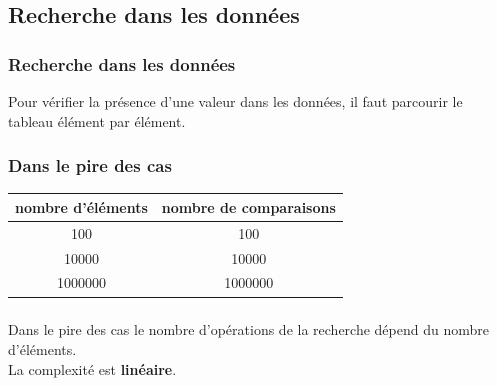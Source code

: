 \documentclass[svgnames,11pt]{beamer}
\begin{document}
\subsection{Recherche dans les données}
\begin{frame}
    \frametitle{Recherche dans les données}

    Pour vérifier la présence d'une valeur dans les données, il faut parcourir le tableau élément par élément.
\begin{center}
\end{center}

\end{frame}
\begin{frame}
    \frametitle{Dans le pire des cas}

    \begin{center}
        \begin{tabular}{|c|c|}
            \hline
            nombre d'éléments&nombre de comparaisons\\
            \hline
            100&100\\
            10000&10000\\
            1000000&1000000\\
            \hline
        \end{tabular}
    \end{center}

\end{frame}
\begin{frame}
    \frametitle{}

    \begin{aretenir}[]
        Dans le pire des cas le nombre d'opérations de la recherche dépend du nombre d'éléments.\\
        \centering La complexité est \textbf{linéaire}.
        \end{aretenir}
\end{frame}
\end{document}
